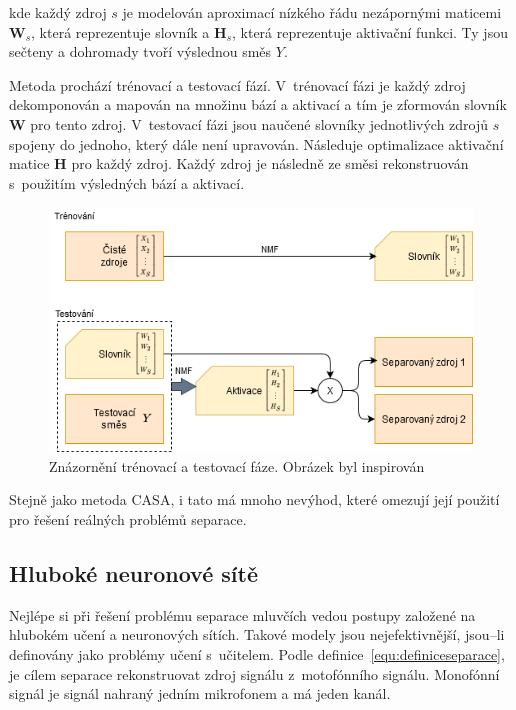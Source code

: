 kde každý zdroj $s$ je modelován aproximací nízkého řádu nezápornými maticemi $\textbf{W}_s$, která reprezentuje slovník a $\textbf{H}_s$, která reprezentuje aktivační funkci. Ty jsou sečteny a dohromady tvoří výslednou směs $Y$.

Metoda prochází trénovací a testovací fází.
V~trénovací fázi je každý zdroj dekomponován a mapován na množinu bází a aktivací a tím je zformován slovník $\textbf{W}$ pro tento zdroj.
V~testovací fázi jsou naučené slovníky jednotlivých zdrojů $s$ spojeny do jednoho, který dále není upravován. Následuje optimalizace aktivační matice $\textbf{H}$ pro každý zdroj. Každý zdroj je následně ze směsi rekonstruován s~použitím výsledných bází a aktivací.

\begin{figure}[H]
    \centering
    \includegraphics[scale=0.6]{obrazky-figures/nmf.png}
    \caption{\label{fig:nmf}Znázornění trénovací a testovací fáze. Obrázek byl inspirován~\cite{speechseparation}}
\end{figure}

Stejně jako metoda CASA, i tato má mnoho nevýhod, které omezují její použití pro řešení reálných problémů separace.




\subsection{Hluboké neuronové sítě}
Nejlépe si při řešení problému separace mluvčích vedou postupy založené na hlubokém učení a neuronových sítích. Takové modely jsou nejefektivnější, jsou--li definovány jako problémy učení s~učitelem. Podle definice~\ref{equ:definiceseparace}, je cílem separace rekonstruovat zdroj signálu z~motofónního signálu. Monofónní signál je signál nahraný jedním mikrofonem a má jeden kanál.


